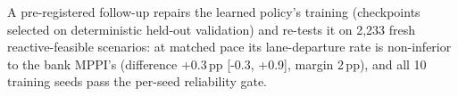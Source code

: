 A pre-registered follow-up repairs the learned policy's training (checkpoints selected on deterministic held-out validation) and re-tests it on 2,233 fresh reactive-feasible scenarios: at matched pace its lane-departure rate is non-inferior to the bank MPPI's (difference +0.3\,pp [-0.3, +0.9], margin 2\,pp), and all 10 training seeds pass the per-seed reliability gate.
